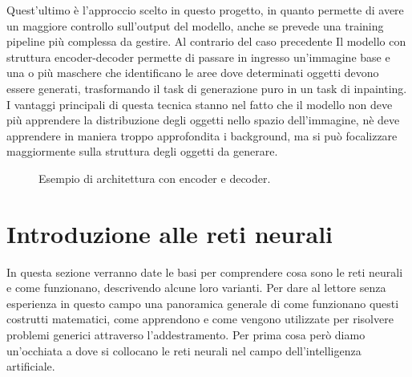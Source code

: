    Quest'ultimo è l'approccio scelto in questo progetto, in quanto permette di avere un maggiore controllo sull'output del modello,
    anche se prevede una training pipeline più complessa da gestire.
    Al contrario del caso precedente Il modello con struttura encoder-decoder permette di passare in ingresso un'immagine base e una o più maschere
    che identificano le aree dove determinati oggetti devono essere generati, trasformando il task di generazione puro in un task di inpainting.
    I vantaggi principali di questa tecnica stanno nel fatto che il modello non deve più apprendere la distribuzione degli oggetti nello spazio dell'immagine,
    nè deve apprendere in maniera troppo approfondita i background, ma si può focalizzare maggiormente sulla struttura degli oggetti da generare.
    
    \begin{figure}[H]
        \centering
        
        \caption{Esempio di architettura con encoder e decoder.}
        \label{fig:encoder_decoder_architecture}
    \end{figure}

\section{Introduzione alle reti neurali \ok}

In questa sezione verranno date le basi per comprendere cosa sono le reti neurali e come funzionano, descrivendo alcune loro varianti.
Per dare al lettore senza esperienza in questo campo una panoramica generale di come funzionano questi costrutti matematici, come apprendono e 
come vengono utilizzate per risolvere problemi generici attraverso l'addestramento. Per prima cosa però diamo un'occhiata a dove si collocano 
le reti neurali nel campo dell'intelligenza artificiale.

